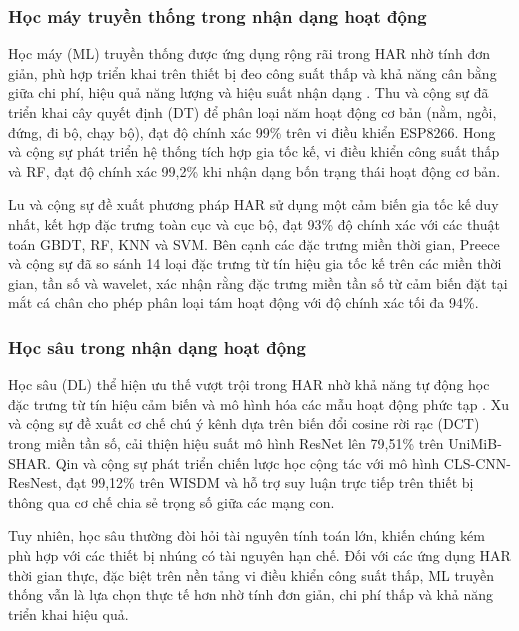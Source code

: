 \subsubsection{Học máy truyền thống trong nhận dạng hoạt động}

Học máy (ML) truyền thống được ứng dụng rộng rãi trong HAR nhờ tính đơn giản, phù hợp triển khai trên thiết bị đeo công suất thấp và khả năng cân bằng giữa chi phí, hiệu quả năng lượng và hiệu suất nhận dạng \cite{HongNhung2023, DaoHieu2022}. Thu và cộng sự \cite{Thu2022} đã triển khai cây quyết định (DT) để phân loại năm hoạt động cơ bản (nằm, ngồi, đứng, đi bộ, chạy bộ), đạt độ chính xác 99\% trên vi điều khiển ESP8266. Hong và cộng sự \cite{HongNhung2023} phát triển hệ thống tích hợp gia tốc kế, vi điều khiển công suất thấp và RF, đạt độ chính xác 99,2\% khi nhận dạng bốn trạng thái hoạt động cơ bản.

Lu và cộng sự \cite{Lu2020} đề xuất phương pháp HAR sử dụng một cảm biến gia tốc kế duy nhất, kết hợp đặc trưng toàn cục và cục bộ, đạt 93\% độ chính xác với các thuật toán GBDT, RF, KNN và SVM. Bên cạnh các đặc trưng miền thời gian, Preece và cộng sự \cite{preece2008_leutheuser2013_Lu2020} đã so sánh 14 loại đặc trưng từ tín hiệu gia tốc kế trên các miền thời gian, tần số và wavelet, xác nhận rằng đặc trưng miền tần số từ cảm biến đặt tại mắt cá chân cho phép phân loại tám hoạt động với độ chính xác tối đa 94\%.

\subsubsection{Học sâu trong nhận dạng hoạt động}

Học sâu (DL) thể hiện ưu thế vượt trội trong HAR nhờ khả năng tự động học đặc trưng từ tín hiệu cảm biến và mô hình hóa các mẫu hoạt động phức tạp \cite{DL2021_HAR_wearable}. Xu và cộng sự \cite{HAR_DCT_deeplearning2023} đề xuất cơ chế chú ý kênh dựa trên biến đổi cosine rời rạc (DCT) trong miền tần số, cải thiện hiệu suất mô hình ResNet lên 79,51\% trên UniMiB-SHAR. Qin và cộng sự \cite{HAR_CNN_2024} phát triển chiến lược học cộng tác với mô hình CLS-CNN-ResNest, đạt 99,12\% trên WISDM và hỗ trợ suy luận trực tiếp trên thiết bị thông qua cơ chế chia sẻ trọng số giữa các mạng con.

Tuy nhiên, học sâu thường đòi hỏi tài nguyên tính toán lớn, khiến chúng kém phù hợp với các thiết bị nhúng có tài nguyên hạn chế. Đối với các ứng dụng HAR thời gian thực, đặc biệt trên nền tảng vi điều khiển công suất thấp, ML truyền thống vẫn là lựa chọn thực tế hơn nhờ tính đơn giản, chi phí thấp và khả năng triển khai hiệu quả.

